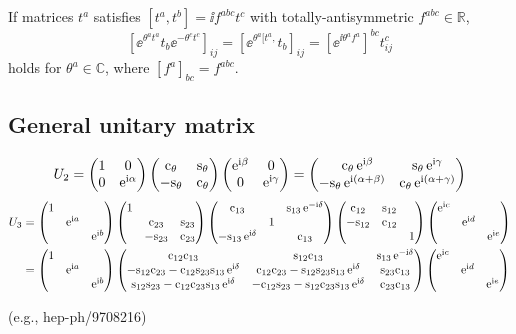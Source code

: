 \documentclass[CheatSheet]{subfiles}
\begin{document}
If matrices $t^a$ satisfies $[t^a,t^b]=\ii f^{abc} t^c$ with totally-antisymmetric $f^{abc}\in\mathbb R$,
\begin{equation}
  \left[\ee^{\theta^at^a} t_b \ee^{-\theta^ct^c}\right]_{ij}
=  \left[\ee^{\theta^a[t^a,}t_b\right]_{ij}
= \left[\ee^{\ii \theta^af^{a}}\right]^{bc} t^c_{ij}
\end{equation}
holds for $\theta^a\in\mathbb C$, where $[f^a]_{bc}=f^{abc}$. 

\subsection{General unitary matrix}
\begin{equation}
 U_2 =
\begin{pmatrix}1&0\\0&\mathop{}\!\mathrm{e}^{\mathrm{i}\alpha}\end{pmatrix}\begin{pmatrix}\mathrm{c}_{\theta}&\mathrm{s}_{\theta}\\-\mathrm{s}_{\theta}&\mathrm{c}_{\theta}\end{pmatrix}\begin{pmatrix}\mathop{}\!\mathrm{e}^{\mathrm{i}\beta}&0\\0&\mathop{}\!\mathrm{e}^{\mathrm{i}\gamma}\end{pmatrix}
=
\begin{pmatrix}\phantom{-}
\mathrm{c}_{\theta}\mathop{}\!\mathrm{e}^{\mathrm{i}\beta} & \mathrm{s}_{\theta}\mathop{}\!\mathrm{e}^{\mathrm{i}\gamma}\\
-\mathrm{s}_{\theta}\mathop{}\!\mathrm{e}^{\mathrm{i}(\alpha+\beta)} & \mathrm{c}_{\theta}\mathop{}\!\mathrm{e}^{\mathrm{i}(\alpha+\gamma)}
\end{pmatrix}
\end{equation}
\begin{align}
 U_3 &=
\pmat{1&&\\&\ee^{\ii a}&\\&&\ee^{\ii b}}
 \pmat{1&&\\&\co{23}&\si{23}\\&-\si{23}&\co{23}}
 \pmat{\co{13}&&\si{13}\ee^{-\ii\delta}\\&1&\\-\si{13}\ee^{\ii\delta}&&\co{13}}
 \pmat{\co{12}&\si{12}&\\-\si{12}&\co{12}&\\&&1}
\pmat{\ee^{\ii c}&&\\&\ee^{\ii d}&\\&&\ee^{\ii e}}
\\&=
\pmat{1&&\\&\ee^{\ii a}&\\&&\ee^{\ii b}}
 \pmat{
 \co{12} \co{13} & \si{12} \co{13} & \si{13} \ee^{-\ii\delta}\\
 -\si{12} \co{23} - \co{12} \si{23} \si{13} \ee^{\ii\delta}& \co{12} \co{23} - \si{12}\si{23}\si{13} \ee^{\ii\delta}& \si{23}\co{13}\\
  \si{12}\si{23} - \co{12} \co{23} \si{13}\ee^{\ii\delta} & -\co{12}\si{23}-\si{12}\co{23}\si{13}\ee^{\ii\delta} & \co{23} \co{13}}
\pmat{\ee^{\ii c}&&\\&\ee^{\ii d}&\\&&\ee^{\ii e}}
\end{align}

%

(e.g., hep-ph/9708216)
\end{document}
